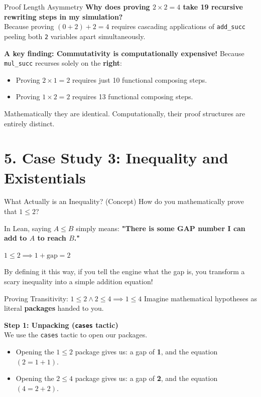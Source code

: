 \documentclass[aspectratio=169, 10pt]{beamer}
\begin{document}
\begin{frame}[fragile]{Proof Length Asymmetry}
    \textbf{Why does proving $2 \times 2 = 4$ take 19 recursive rewriting steps in my simulation?} \\
    Because proving $(0 + 2) + 2 = 4$ requires cascading applications of \texttt{add\_succ} peeling both \texttt{2} variables apart simultaneously.
    
    \vspace{1em}
    \textbf{A key finding: Commutativity is computationally expensive!}
    Because \texttt{mul\_succ} recurses solely on the \textbf{right}:
    \begin{itemize}
        \item Proving $2 \times 1 = 2$ requires just 10 functional composing steps.
        \item Proving $1 \times 2 = 2$ requires 13 functional composing steps.
    \end{itemize}
    
    Mathematically they are identical. Computationally, their proof structures are entirely distinct.
\end{frame}

\section{5. Case Study 3: Inequality and Existentials}

\begin{frame}[fragile]{What Actually is an Inequality? (Concept)}
    How do you mathematically prove that $1 \le 2$? 
    
    \vspace{1em}
    In Lean, saying $A \le B$ simply means: \textbf{"There is some GAP number I can add to $A$ to reach $B$."}
    \begin{center}
        \Large $1 \le 2 \implies 1 + \text{gap} = 2$
    \end{center}

    \vspace{1em}
    By defining it this way, if you tell the engine what the gap is, you transform a scary inequality into a simple addition equation!
\end{frame}

\begin{frame}[fragile]{Proving Transitivity: $1 \le 2 \land 2 \le 4 \implies 1 \le 4$}
    Imagine mathematical hypotheses as literal \textbf{packages} handed to you. 
    
    \vspace{1em}
    \textbf{Step 1: Unpacking (\texttt{cases} tactic)} \\
    We use the \texttt{cases} tactic to open our packages.
    \begin{itemize}
        \item Opening the $1 \le 2$ package gives us: a gap of \textbf{1}, and the equation $(2 = 1 + 1)$.
        \item Opening the $2 \le 4$ package gives us: a gap of \textbf{2}, and the equation $(4 = 2 + 2)$.
    \end{itemize}
\end{frame}
\end{document}
